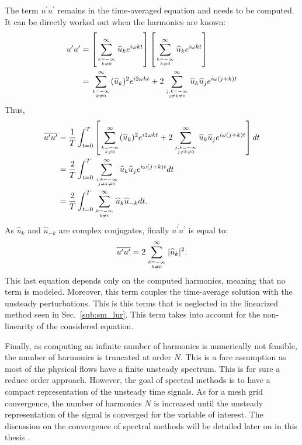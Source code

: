 The term $\overline{u^\prime u^\prime}$ remains in the time-averaged
equation and needs to be computed. It can be 
directly worked out when the harmonics are known:
\begin{equation}
	\begin{split}
		u^\prime u^\prime &= 
		\left[
			\sum_{k=-\infty \atop k \neq 0}^{\infty} \widehat{u}_k e^{i \omega k t} 
		\right]
		\left[
			\sum_{k=-\infty \atop k \neq 0}^{\infty} \widehat{u}_k e^{i \omega k t} 
		\right] \\
		&= \sum_{k=-\infty \atop k \neq 0}^{\infty} (\widehat{u}_k)^2
		   e^{i 2 \omega k t} +
		   2 \sum_{j,k=-\infty \atop j \neq k \neq 0}^{\infty} 
		   \widehat{u}_k \widehat{u}_j e^{i \omega (j + k) t} \\
	\end{split}
\end{equation}
Thus,
\begin{equation}
	\begin{split}
		\overline{u^\prime u^\prime} &= 
		\frac{1}{T} \int_{t=0}^{T} \left[ 
			\sum_{k=-\infty \atop k \neq 0}^{\infty} (\widehat{u}_k)^2
		   	e^{i 2 \omega k t} +
		   	2 \sum_{j,k=-\infty \atop j \neq k \neq 0}^{\infty} 
		   	\widehat{u}_k \widehat{u}_j e^{i \omega (j + k) t} 
		\right] dt\\
		&= \frac{2}{T} \int_{t=0}^{T} \sum_{j,k=-\infty \atop j \neq k \neq 0}^{\infty} 
		   	\widehat{u}_k \widehat{u}_j 
		   	e^{i \omega (j + k) t} dt \\
		&= \frac{2}{T} \int_{t=0}^{T} 
			\sum_{k=-\infty \atop k \neq 0}^{\infty} 
			\widehat{u}_k \widehat{u}_{-k}  dt.
	\end{split}
\end{equation}
As $\widehat{u}_k$ and $\widehat{u}_{-k}$ are complex conjugates,
finally $\overline{u^\prime u^\prime}$ is equal to:
\begin{equation}
	\overline{u^\prime u^\prime} = 
	2 \sum_{k=-\infty \atop k \neq 0}^{\infty} |\widehat{u}_k|^2.
	\label{eq:sm_nlh_deterministic_stress_terms}
\end{equation}
This last equation depends only on the computed harmonics, meaning
that no term is modeled. Moreover, this term couples the
time-average solution with the unsteady perturbations. This is this
terms that is neglected in the linearized method seen in 
Sec.~\ref{sub:sm_lur}. This term takes into account for the 
non-linearity of the considered equation.

Finally, as computing an infinite number of harmonics is 
numerically not feasible,
the number of harmonics is truncated at order $N$. 
This is a fare assumption as most
of the physical flows have a finite unsteady spectrum. This
is for sure a reduce order approach. However, the goal of spectral
methods is to have a compact representation of the unsteady time
signals. As for a mesh grid convergence, the number of harmonics $N$
is increased until the unsteady representation of the signal is
converged for the variable of interest. The discussion on the
convergence of spectral methods will be detailed later on in this 
thesis .

